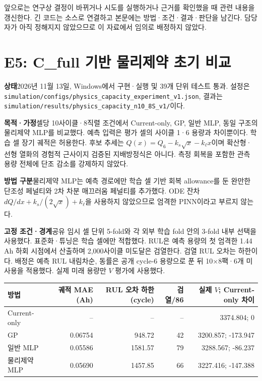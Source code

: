 \documentclass[11pt,a4paper]{article}
\newcommand{\file}[1]{{\small\nolinkurl{#1}}}
\begin{document}
앞으로는 연구상 결정이 바뀌거나 시도를 실행하거나 근거를 확인했을 때 관련 내용을 갱신한다. 긴 코드는 소스로 연결하고 본문에는 방법·조건·결과·판단을 남긴다. 담당자가 아직 정해지지 않았으므로 이 자료에서 임의로 배정하지 않았다.

\clearpage
\section{E5: C\_full 기반 물리제약 초기 비교}
\textbf{상태}\quad 2026년 11월 13일, Windows에서 구현·실행 및 39개 단위 테스트 통과. 설정은 \file{simulation/configs/physics_capacity_experiment_v1.json}, 결과는 \file{simulation/results/physics_capacity_n10_8S_v1/}이다.

\textbf{목적·가정}\quad 셀당 10사이클·8직렬 조건에서 Current-only, GP, 일반 MLP, 동일 구조의 물리제약 MLP를 비교했다. 예측 입력은 평가 셀의 사이클 1·6 용량과 차이뿐이다. 학습 셀 장기 궤적은 허용한다. 후보 추세는 $Q(x)=Q_6-k_s\sqrt{x}-k_\ell x$이며 확산형·선형 열화의 경험적 근사이지 검증된 지배방정식은 아니다. 측정 회복을 포함한 관측 용량 전체에 단조 감소를 강제하지 않았다.

\textbf{방법 구분}\quad 물리제약 MLP는 예측 경로에만 학습 셀 기반 회복 allowance를 둔 완만한 단조성 페널티와 2차 차분 매끄러움 페널티를 추가했다. ODE 잔차 $dQ/dx+k_s/(2\sqrt{x})+k_\ell$을 사용하지 않았으므로 엄격한 PINN이라고 부르지 않는다.

\textbf{고정 조건·경계}\quad 공유 임시 셀 단위 5-fold와 각 외부 학습 fold 안의 3-fold 내부 선택을 사용했다. 표준화·튜닝은 학습 셀에만 적합했다. RUL은 예측 용량의 첫 엄격한 1.44 Ah 하회 시점에서 산출하며 2,000사이클 미도달은 검열한다. 검열 RUL 오차는 하한이다. 배정은 예측 RUL 내림차순, 동률은 공개 cycle-6 용량으로 푼 뒤 10×8팩·6개 미사용을 적용했다. 실제 미래 용량만 $V$ 평가에 사용했다.

\begin{center}
\begin{tabular}{lrrrr}
\toprule
방법 & 궤적 MAE (Ah) & RUL 오차 하한 (cycle) & 검열/86 & 실제 $V$; Current-only 차이 \\
\midrule
Current-only & -- & -- & -- & 3374.804; 0 \\
GP & 0.06754 & 948.72 & 42 & 3200.857; -173.947 \\
일반 MLP & 0.05586 & 1581.57 & 79 & 3288.567; -86.237 \\
물리제약 MLP & 0.05690 & 1457.85 & 66 & 3227.416; -147.388 \\
\bottomrule
\end{tabular}
\end{center}
\end{document}
